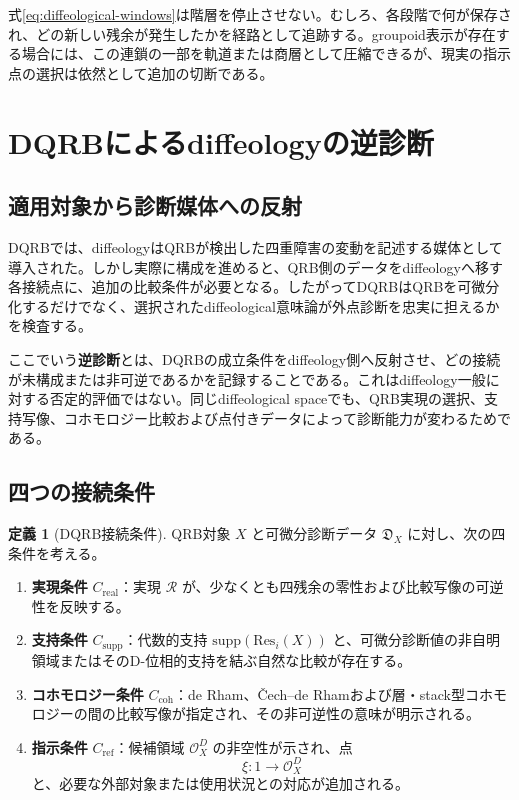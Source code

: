 \documentclass[a4paper,11pt]{ltjsarticle}
\theoremstyle{definition}
\newtheorem{definition}{定義}[section]
\theoremstyle{plain}
\newcommand{\Res}{\mathrm{Res}}
\newcommand{\supp}{\mathrm{supp}}
\begin{document}
式\eqref{eq:diffeological-windows}は階層を停止させない。むしろ、各段階で何が保存され、どの新しい残余が発生したかを経路として追跡する。groupoid表示が存在する場合には、この連鎖の一部を軌道または商層として圧縮できるが、現実の指示点の選択は依然として追加の切断である。

\section{DQRBによるdiffeologyの逆診断}

\subsection{適用対象から診断媒体への反射}

DQRBでは、diffeologyはQRBが検出した四重障害の変動を記述する媒体として導入された。しかし実際に構成を進めると、QRB側のデータをdiffeologyへ移す各接続点に、追加の比較条件が必要となる。したがってDQRBはQRBを可微分化するだけでなく、選択されたdiffeological意味論が外点診断を忠実に担えるかを検査する。

ここでいう\textbf{逆診断}とは、DQRBの成立条件をdiffeology側へ反射させ、どの接続が未構成または非可逆であるかを記録することである。これはdiffeology一般に対する否定的評価ではない。同じdiffeological spaceでも、QRB実現の選択、支持写像、コホモロジー比較および点付きデータによって診断能力が変わるためである。

\subsection{四つの接続条件}

\begin{definition}[DQRB接続条件]
QRB対象 $X$ と可微分診断データ $\mathfrak D_X$ に対し、次の四条件を考える。
\begin{enumerate}
 \item \textbf{実現条件} $C_{\mathrm{real}}$：実現 $\mathcal R$ が、少なくとも四残余の零性および比較写像の可逆性を反映する。
 \item \textbf{支持条件} $C_{\mathrm{supp}}$：代数的支持 $\supp(\Res_i(X))$ と、可微分診断値の非自明領域またはそのD-位相的支持を結ぶ自然な比較が存在する。
 \item \textbf{コホモロジー条件} $C_{\mathrm{coh}}$：de Rham、\v{C}ech--de Rhamおよび層・stack型コホモロジーの間の比較写像が指定され、その非可逆性の意味が明示される。
 \item \textbf{指示条件} $C_{\mathrm{ref}}$：候補領域 $\mathcal O_X^D$ の非空性が示され、点
 \begin{equation}
  \xi:1\longrightarrow\mathcal O_X^D
 \end{equation}
 と、必要な外部対象または使用状況との対応が追加される。
\end{enumerate}
\end{definition}
\end{document}

